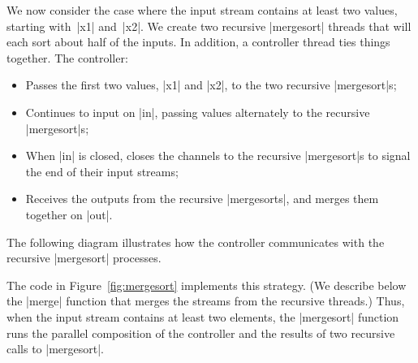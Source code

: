 We now consider the case where the input stream contains at least two values,
starting with~|x1| and~|x2|.  We create two recursive |mergesort|
threads that will each sort about half of the inputs.  In addition, a
controller thread ties things together.  The controller:
%
\begin{itemize}
\item Passes the first two values, |x1| and |x2|, to the two recursive
  |mergesort|s;

\item Continues  to input on |in|, passing values alternately to the  recursive
  |mergesort|s;

\item When |in| is closed, closes the channels to the recursive |mergesort|s
  to signal the end of their input streams;

\item Receives the outputs from the recursive |mergesorts|, and merges them
  together on |out|.
\end{itemize}
%
The following diagram illustrates how the controller communicates with the
recursive |mergesort| processes.
%
\begin{center}
\end{center}


The code in Figure~\ref{fig:mergesort} implements this strategy.  (We describe
below the |merge| function that merges the streams from the recursive
threads.)  Thus, when the input stream contains at least two elements, the
|mergesort| function runs the parallel composition of the controller and the
results of two recursive calls to |mergesort|.

